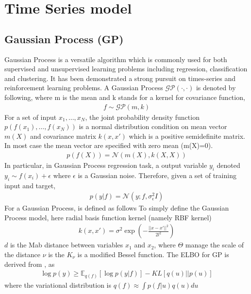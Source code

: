 \section{Time Series model}
\subsection{Gaussian Process (GP)}
Gaussian Process is a versatile algorithm which is commonly used for both supervised and unsupervised learning problems including regression, classification and clustering. It has been demonstrated a strong pursuit on times-series and reinforcement learning problems. A Gaussian Process $ \mathcal{GP}(\cdot,\cdot) $ is denoted by following, where m is the mean and k stands for a kernel for covariance function,
\begin{align*}
f\sim\mathcal{GP}(m,k)
\end{align*}
For a set of input $ x_1,\dots,x_N $, the joint probability density function $ p(f(x_1),\dots,f(x_N)) $ is a normal distribution condition on mean vector $ m(X) $ and covariance matrix $ k(x,x') $ which is a positive semidefinite matrix. In most case the mean vector are specified with zero mean (m(X)=0).
\begin{align*}
p(f(X))=\mathcal{N}(m(X),k(X,X))
\end{align*}
In particular, in Gaussian Process regression task, a output variable $ y_i $ denoted $ y_i\sim f(x_i)+\epsilon $ where $ \epsilon $ is a Gaussian noise. Therefore, given a set of training input and target, 
\begin{align*}
p(y|f)=\mathcal{N}(y;f,\sigma_\epsilon^2I)
\end{align*}
For a Gaussian Process, is defined as follows
To simply define the Gaussian Process model, here 
radial basis function kernel (namely RBF kernel)
\begin{align*}
k(x,x')=\sigma^2\exp\left(-\frac{||x-x'||^2}{2l^2}\right)
\end{align*}
$ d $ is the Mab distance between variables $ x_1 $ and $ x_2 $, where $ \Theta $ manage the scale of the distance
$ \nu $ is the 
$ K_\nu $ is a modified Bessel function.
The ELBO for GP is derived from \cite{hensman_gaussian_nodate}, as
\begin{align*}
\log p(y)\geq\mathbb{E}_{q(f)}[\log p(y|f)]-KL[q(u)||p(u)]
\end{align*}
where the variational distribution is $ q(f)\approx\int p(f|u)q(u)du $
